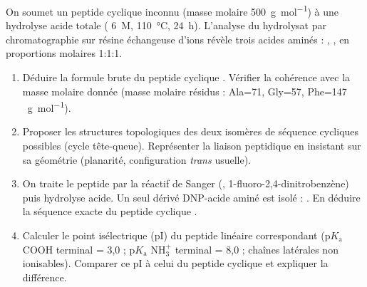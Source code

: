\documentclass[11pt]{article}
\begin{document}
\begin{exercice}
On soumet un peptide cyclique inconnu  (masse molaire \SI{500}{g.mol^{-1}}) à une hydrolyse acide totale ( \SI{6}{M}, \SI{110}{\celsius}, \SI{24}{h}). L'analyse du hydrolysat par chromatographie sur résine échangeuse d'ions révèle trois acides aminés : , ,  en proportions molaires 1:1:1.
\begin{enumerate}
    \item Déduire la formule brute du peptide cyclique . Vérifier la cohérence avec la masse molaire donnée (masse molaire résidus : Ala=71, Gly=57, Phe=147 \SI{}{g.mol^{-1}}).
    \item Proposer les structures topologiques des deux isomères de séquence cycliques possibles (cycle tête-queue). Représenter la liaison peptidique en insistant sur sa géométrie (planarité, configuration \textit{trans} usuelle).
    \item On traite le peptide  par la réactif de Sanger (, 1-fluoro-2,4-dinitrobenzène) puis hydrolyse acide. Un seul dérivé DNP-acide aminé est isolé : . En déduire la séquence exacte du peptide cyclique .
    \item Calculer le point isélectrique (pI) du peptide linéaire correspondant  (p$K_\text{a}$ COOH terminal = 3,0 ; p$K_\text{a}$ NH$_3^+$ terminal = 8,0 ; chaînes latérales non ionisables). Comparer ce pI à celui du peptide cyclique  et expliquer la différence.
\end{enumerate}
\end{exercice}
\end{document}
